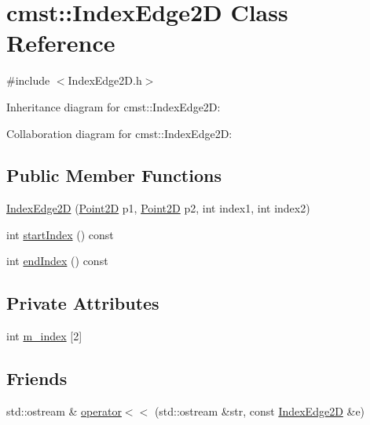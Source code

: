\hypertarget{classcmst_1_1_index_edge2_d}{}\section{cmst\+:\+:Index\+Edge2D Class Reference}
\label{classcmst_1_1_index_edge2_d}


{\ttfamily \#include $<$Index\+Edge2\+D.\+h$>$}



Inheritance diagram for cmst\+:\+:Index\+Edge2D\+:


Collaboration diagram for cmst\+:\+:Index\+Edge2D\+:
\subsection*{Public Member Functions}
\begin{DoxyCompactItemize}
\item 
\hyperlink{classcmst_1_1_index_edge2_d_aa01ca9e529a319fffb5f500ab7218ef6}{Index\+Edge2D} (\hyperlink{classcmst_1_1_point2_d}{Point2D} p1, \hyperlink{classcmst_1_1_point2_d}{Point2D} p2, int index1, int index2)
\item 
int \hyperlink{classcmst_1_1_index_edge2_d_ab92c0b814ea9c354a71acfc84c871f72}{start\+Index} () const 
\item 
int \hyperlink{classcmst_1_1_index_edge2_d_ad50c559d38e5857c03be255774deff12}{end\+Index} () const 
\end{DoxyCompactItemize}
\subsection*{Private Attributes}
\begin{DoxyCompactItemize}
\item 
int \hyperlink{classcmst_1_1_index_edge2_d_a38fdada0cc5c0807ec7970cda8705428}{m\+\_\+index} \mbox{[}2\mbox{]}
\end{DoxyCompactItemize}
\subsection*{Friends}
\begin{DoxyCompactItemize}
\item 
std\+::ostream \& \hyperlink{classcmst_1_1_index_edge2_d_a07a17f57bc3f2f18232965531f0b62b4}{operator$<$$<$} (std\+::ostream \&str, const \hyperlink{classcmst_1_1_index_edge2_d}{Index\+Edge2D} \&e)
\end{DoxyCompactItemize}

